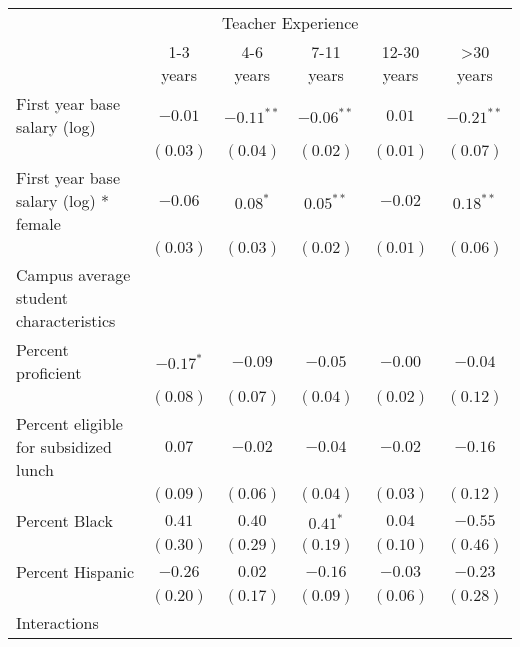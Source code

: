 \documentclass[]{article}
\begin{document}
\begin{table}
\begin{center}
\begin{tabular}{l c c c c c }
\hline
 & \multicolumn{4}{c}{Teacher Experience} \\ \cline{2-6}
 & 1-3 years & 4-6 years & 7-11 years & 12-30 years & >30 years \\
\hline
First year base salary (log)                & $-0.01$      & $-0.11^{**}$ & $-0.06^{**}$ & $0.01$      & $-0.21^{**}$ \\
                                            & $(0.03)$     & $(0.04)$     & $(0.02)$     & $(0.01)$    & $(0.07)$     \\
First year base salary (log) * female       & $-0.06$      & $0.08^{*}$   & $0.05^{**}$  & $-0.02$     & $0.18^{**}$  \\
                                            & $(0.03)$     & $(0.03)$     & $(0.02)$     & $(0.01)$    & $(0.06)$     \\
Campus average student characteristics      &              &              &              &             &              \\
\quad Percent proficient                    & $-0.17^{*}$  & $-0.09$      & $-0.05$      & $-0.00$     & $-0.04$      \\
                                            & $(0.08)$     & $(0.07)$     & $(0.04)$     & $(0.02)$    & $(0.12)$     \\
\quad Percent eligible for subsidized lunch & $0.07$       & $-0.02$      & $-0.04$      & $-0.02$     & $-0.16$      \\
                                            & $(0.09)$     & $(0.06)$     & $(0.04)$     & $(0.03)$    & $(0.12)$     \\
\quad Percent Black                         & $0.41$       & $0.40$       & $0.41^{*}$   & $0.04$      & $-0.55$      \\
                                            & $(0.30)$     & $(0.29)$     & $(0.19)$     & $(0.10)$    & $(0.46)$     \\
\quad Percent Hispanic                      & $-0.26$      & $0.02$       & $-0.16$      & $-0.03$     & $-0.23$      \\
                                            & $(0.20)$     & $(0.17)$     & $(0.09)$     & $(0.06)$    & $(0.28)$     \\
Interactions                                &              &              &              &             &              \\

\end{tabular}
\end{center}
\end{table}
\end{document}
